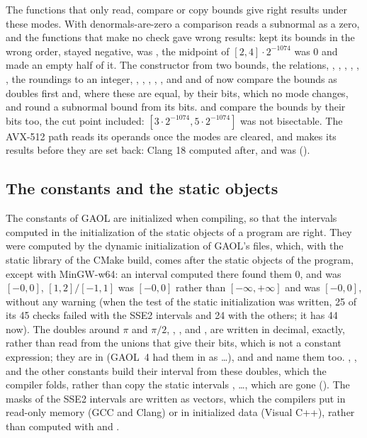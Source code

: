 \medskip
The functions that only read, compare or copy bounds give right results under
these modes. With denormals-are-zero a comparison reads a subnormal as a
zero, and the functions that make no check gave wrong results:
 kept its bounds in the wrong order,
 stayed negative,  was
\code{[-0]}, the midpoint of $[2, 4] \cdot 2^{-1074}$ was 0 and
 made an empty half of it. The constructor from two bounds, the
relations, \code{\&}, \code{|}, , , ,
, the roundings to an integer, , ,
, , , and 
and  of  now compare the bounds as doubles
first and, where these are equal, by their bits, which no mode changes, and
round a subnormal bound from its bits.  and
 compare the bounds by their bits too, the cut point
included: $[3 \cdot 2^{-1074}, 5 \cdot 2^{-1074}]$ was not bisectable. The
AVX-512 path reads its operands once the modes are cleared, and makes its
results before they are set back: Clang 18 computed  after, and
\code{[3e-308] - [2.9e-308]} was \code{[0, 0]} ().

\subsection{The constants and the static objects}
\label{sec:changes-constants}
%

The constants of GAOL are initialized when compiling, so that the intervals
computed in the initialization of the static objects of a program are
right.\newinvfive{} They were computed by the dynamic initialization of
GAOL's files, which, with the static library of the CMake build, comes after
the static objects of the program, except with MinGW-w64: an interval
computed there found them 0, and  was $[-0, 0]$,
$[1, 2]/[-1, 1]$ was $[-0, 0]$ rather than $[-\infty, +\infty]$ and
 was $[-0, 0]$, without any warning (when the test of the
static initialization was written, 25 of its 45 checks failed with the SSE2
intervals and 24 with the others; it has 44 now). The doubles around $\pi$ and $\pi/2$, ,
,  and ,
are written in decimal, exactly, rather than read from the unions that give
their bits, which is not a constant expression; they are in 
(GAOL~4 had them in  as \ldots), and  and
 name them too. , ,
 and the other constants build their interval from these
doubles, which the compiler folds, rather than copy the static intervals
, \ldots, which are gone
(). The masks of the SSE2 intervals are written
as vectors, which the compilers put in read-only memory (GCC and Clang) or in
initialized data (Visual C++), rather than computed with 
and .

